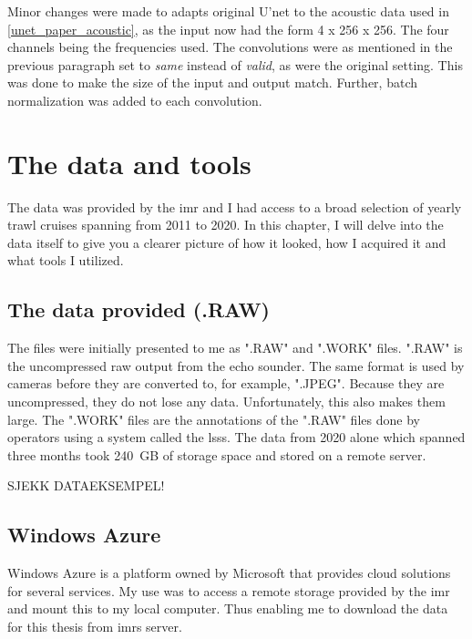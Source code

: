     
    Minor changes were made to adapt\citeauthor{unet_ronneberger2015}s original U'net to the acoustic data used in \ref{unet_paper_acoustic}, as the input now had the form 4 x 256 x 256. The four channels being the frequencies used. The convolutions were as mentioned in the previous paragraph set to \textit{same} instead of \textit{valid}, as were the original setting. This was done to make the size of the input and output match. Further, batch normalization was added to each convolution. 
    

\clearpage
\section{The data and tools}
    The data was provided by the \gls{imr} and I had access to a broad selection of yearly trawl cruises spanning from 2011 to 2020. In this chapter, I will delve into the data itself to give you a clearer picture of how it looked, how I acquired it and what tools I utilized.
    
    \subsection{The data provided (.RAW)}
        The files were initially presented to me as ".RAW" \cite{raw} and ".WORK" files. ".RAW" is the uncompressed raw output from the echo sounder. The same format is used by cameras before they are converted to, for example, ".JPEG". Because they are uncompressed, they do not lose any data. Unfortunately, this also makes them large. The ".WORK" files are the annotations of the ".RAW" files done by operators using a system called the \Gls{lsss}\cite{lsss}. The data from 2020 alone which spanned three months took 240 GB of storage space and stored on a remote server.
        
        SJEKK DATAEKSEMPEL!
    \subsection{Windows Azure}
        Windows Azure \cite{azure} is a platform owned by Microsoft that provides cloud solutions for several services. My use was to access a remote storage provided by the \gls{imr} and mount this to my local computer. Thus enabling me to download the data for this thesis from \gls{imr}s server. 
    
